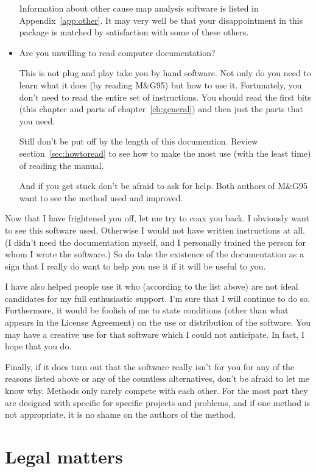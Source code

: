 \documentclass[%
	11pt,
        a4paper,
        twoside]{workrep}
\newcommand{\MG}{M\&G95\xspace}			%
\begin{document}
\begin{itemize}
  Information about other cause map analysis software is listed
  in Appendix~\ref{app:other}.  It may very well be that your
  disappointment in this package is matched by satisfaction with
  some of these others.

\item
  Are you unwilling to read computer documentation?

  This is not plug and play take you by hand software.  Not only do
  you need to learn what it does (by reading \MG) but how to use it.
  Fortunately, you don't need to read the entire set of instructions.
  You should read the first bits (this chapter and
  parts of chapter~\ref{ch:general}) and then just the parts that you
  need.

  Still don't be put off by the length of this documention.
  Review section~\ref{sec:howtoread} to see how to make
  the most use (with the least time) of reading the manual.

  And if you get stuck don't be afraid to ask for help.  Both
  authors of \MG want to see the method used and improved.

\end{itemize}

Now that I have frightened you off, let me try to coax you back.
I obviously want to see this software used.  Otherwise I would not have
written instructions at all.  (I didn't need the documentation myself,
and I personally trained the person for whom I wrote the software.)
So do take the existence of the documentation as a sign that I
really do want to help you use it if it will be useful to you.

I have also helped people use it who (according to the list above)
are not ideal candidates for my full enthusiastic support.  I'm sure
that I will continue to do so.  Furthermore, it would be foolish of
me to state conditions (other than what appears in the License Agreement)
on the use or distribution of the software.  You may have a creative
use for that software which I could not anticipate.  In fact, I hope
that you do.

Finally, if it does turn out that the software really isn't for you for
any of the reasons listed above or any of the countless alternatives,
don't be afraid to let me know why.  Methods only rarely compete with
each other.  For the most part they are designed with specific for
specific projects and problems, and if one method is not appropriate,
it is no shame on the authors of the method.


\section{Legal matters}
\end{document}
